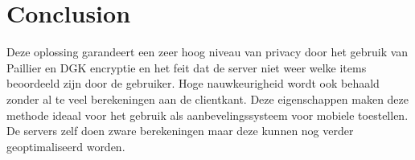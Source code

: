 \documentclass[twocolumn]{phdsymp} %
\begin{document}
\section{Conclusion}

Deze oplossing garandeert een zeer hoog niveau van privacy door het gebruik van Paillier en DGK encryptie en het feit dat de server niet weer welke items beoordeeld zijn door de gebruiker. Hoge nauwkeurigheid wordt ook behaald zonder al te veel berekeningen aan de clientkant. Deze eigenschappen maken deze methode ideaal voor het gebruik als aanbevelingssysteem voor mobiele toestellen. De servers zelf doen zware berekeningen maar deze kunnen nog verder geoptimaliseerd worden.








\nocite{*}

\end{document}
